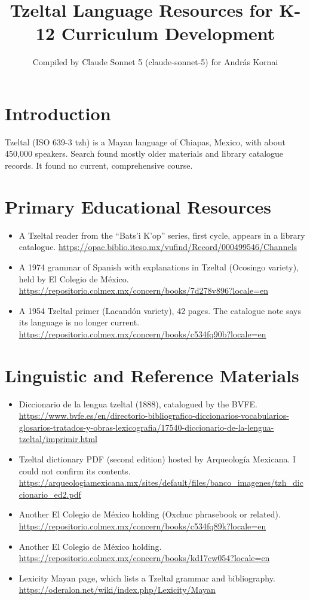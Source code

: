 \documentclass[12pt]{article}
\title{Tzeltal Language Resources for K-12 Curriculum Development}
\author{Compiled by Claude Sonnet 5 (claude-sonnet-5) for Andr\'as Kornai}
\date{}
\begin{document}
\maketitle
\section{Introduction}
Tzeltal (ISO 639-3 tzh) is a Mayan language of Chiapas, Mexico, with about 450,000 speakers. Search found mostly older materials and library catalogue records. It found no current, comprehensive course.
\section{Primary Educational Resources}
\begin{itemize}
\item A Tzeltal reader from the ``Bats'i K'op'' series, first cycle, appears in a library catalogue. \url{https://opac.biblio.iteso.mx/vufind/Record/000499546/Channels}
\item A 1974 grammar of Spanish with explanations in Tzeltal (Ocosingo variety), held by El Colegio de M\'exico. \url{https://repositorio.colmex.mx/concern/books/7d278v896?locale=en}
\item A 1954 Tzeltal primer (Lacand\'on variety), 42 pages. The catalogue note says its language is no longer current. \url{https://repositorio.colmex.mx/concern/books/c534fq90b?locale=en}
\end{itemize}
\section{Linguistic and Reference Materials}
\begin{itemize}
\item Diccionario de la lengua tzeltal (1888), catalogued by the BVFE. \url{https://www.bvfe.es/en/directorio-bibliografico-diccionarios-vocabularios-glosarios-tratados-y-obras-lexicografia/17540-diccionario-de-la-lengua-tzeltal/imprimir.html}
\item Tzeltal dictionary PDF (second edition) hosted by Arqueolog\'ia Mexicana. I could not confirm its contents. \url{https://arqueologiamexicana.mx/sites/default/files/banco_imagenes/tzh_diccionario_ed2.pdf}
\item Another El Colegio de M\'exico holding (Oxchuc phrasebook or related). \url{https://repositorio.colmex.mx/concern/books/c534fq89k?locale=en}
\item Another El Colegio de M\'exico holding. \url{https://repositorio.colmex.mx/concern/books/kd17cw054?locale=en}
\item Lexicity Mayan page, which lists a Tzeltal grammar and bibliography. \url{https://oderalon.net/wiki/index.php/Lexicity/Mayan}
\end{itemize}
\end{document}
